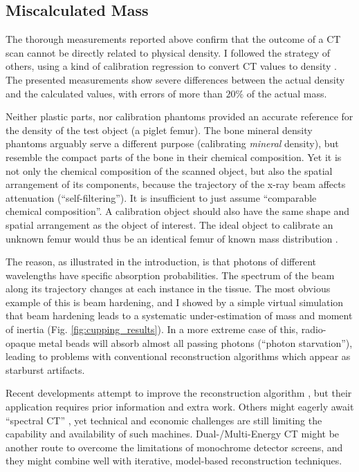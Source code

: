 \subsection{Miscalculated Mass}
\label{sec:org50692a8}
The thorough measurements reported above confirm that the outcome of a CT scan cannot be directly related to physical density.
I followed the strategy of others, using a kind of calibration regression to convert CT values to density \citep{Mull1984,Phillips1997,DuPlessis2013,Durston2022,Fath2023}.
The presented measurements show severe differences between the actual density and the calculated values, with errors of more than \(20 \%\) of the actual mass.


Neither plastic parts, nor calibration phantoms provided an accurate reference for the density of the test object (a piglet femur).
The bone mineral density phantoms arguably serve a different purpose (calibrating \emph{mineral} density), but resemble the compact parts of the bone in their chemical composition.
Yet it is not only the chemical composition of the scanned object, but also the spatial arrangement of its components, because the trajectory of the x-ray beam affects attenuation (``self-filtering'').
It is insufficient to just assume ``comparable chemical composition''.
A calibration object should also have the same shape and spatial arrangement as the object of interest.
The ideal object to calibrate an unknown femur would thus be an identical femur of known mass distribution \citep[which is actually attempted in clinical tomography, cf.][]{Lennie2021}.


The reason, as illustrated in the introduction, is that photons of different wavelengths have specific absorption probabilities.
The spectrum of the beam along its trajectory changes at each instance in the tissue.
The most obvious example of this is beam hardening, and I showed by a simple virtual simulation that beam hardening leads to a systematic under-estimation of mass and moment of inertia (Fig. \ref{fig:cupping_results}).
In a more extreme case of this, radio-opaque metal beads will absorb almost all passing photons (``photon starvation''), leading to problems with conventional reconstruction algorithms which appear as starburst artifacts.


Recent developments attempt to improve the reconstruction algorithm \citep{Six2019,Frenkel2022,Yang2021,Batenburg2011}, but their application requires prior information and extra work.
Others might eagerly await ``spectral CT'' \citep{Liu2023}, yet technical and economic challenges are still limiting the capability and availability of such machines.
Dual-/Multi-Energy CT might be another route to overcome the limitations of monochrome detector screens, and they might combine well with iterative, model-based reconstruction techniques.
